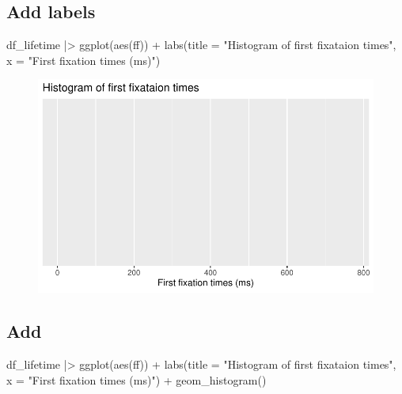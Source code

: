 \documentclass[
  letterpaper,
  DIV=11,
  numbers=noendperiod]{scrartcl}
\newenvironment{Shaded}{\begin{snugshade}}{\end{snugshade}}
\newcommand{\AttributeTok}[1]{\textcolor[rgb]{0.40,0.45,0.13}{#1}}
\newcommand{\FunctionTok}[1]{\textcolor[rgb]{0.28,0.35,0.67}{#1}}
\newcommand{\NormalTok}[1]{\textcolor[rgb]{0.00,0.23,0.31}{#1}}
\newcommand{\SpecialCharTok}[1]{\textcolor[rgb]{0.37,0.37,0.37}{#1}}
\newcommand{\StringTok}[1]{\textcolor[rgb]{0.13,0.47,0.30}{#1}}
\begin{document}
\hypertarget{add-labels}{%
\subsection{Add labels}\label{add-labels}}

\begin{Shaded}
\begin{Highlighting}[]
\NormalTok{df\_lifetime }\SpecialCharTok{|\textgreater{}} \FunctionTok{ggplot}\NormalTok{(}\FunctionTok{aes}\NormalTok{(ff)) }\SpecialCharTok{+} 
  \FunctionTok{labs}\NormalTok{(}\AttributeTok{title =} \StringTok{"Histogram of first fixataion times"}\NormalTok{,}
       \AttributeTok{x =} \StringTok{"First fixation times (ms)"}\NormalTok{)}
\end{Highlighting}
\end{Shaded}

\begin{figure}[H]

{\centering \includegraphics{_data_viz_files/figure-pdf/unnamed-chunk-12-1.pdf}

}

\end{figure}

\hypertarget{add}{%
\subsection{Add}\label{add}}

\begin{Shaded}
\begin{Highlighting}[]
\NormalTok{df\_lifetime }\SpecialCharTok{|\textgreater{}} \FunctionTok{ggplot}\NormalTok{(}\FunctionTok{aes}\NormalTok{(ff)) }\SpecialCharTok{+} 
  \FunctionTok{labs}\NormalTok{(}\AttributeTok{title =} \StringTok{"Histogram of first fixataion times"}\NormalTok{,}
       \AttributeTok{x =} \StringTok{"First fixation times (ms)"}\NormalTok{) }\SpecialCharTok{+}
  \FunctionTok{geom\_histogram}\NormalTok{()}
\end{Highlighting}
\end{Shaded}
\end{document}
